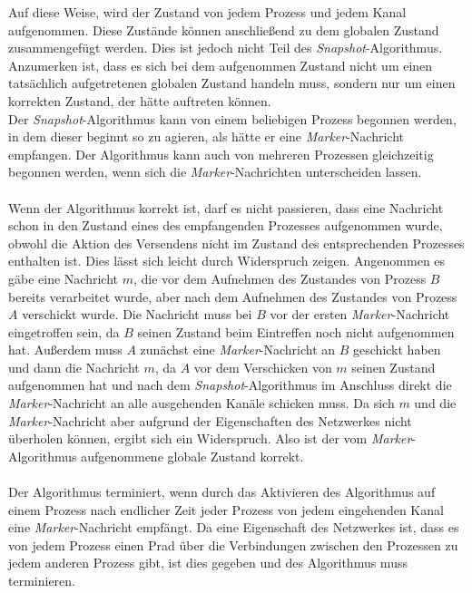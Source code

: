 \documentclass[ngerman]{fbi-aufgabenblatt}
\begin{document}
Auf diese Weise, wird der Zustand von jedem Prozess und jedem Kanal aufgenommen. Diese Zustände können anschließend zu dem globalen Zustand zusammengefügt werden. Dies ist jedoch nicht Teil des \textit{Snapshot}-Algorithmus. Anzumerken ist, dass es sich bei dem aufgenommen Zustand nicht um einen tatsächlich aufgetretenen globalen Zustand handeln muss, sondern nur um einen korrekten Zustand, der hätte auftreten können. \\
Der \textit{Snapshot}-Algorithmus kann von einem beliebigen Prozess begonnen werden, in dem dieser beginnt so zu agieren, als hätte er eine \textit{Marker}-Nachricht empfangen. Der Algorithmus kann auch von mehreren Prozessen gleichzeitig begonnen werden, wenn sich die \textit{Marker}-Nachrichten unterscheiden lassen. \\
\\
Wenn der Algorithmus korrekt ist, darf es nicht passieren, dass eine Nachricht schon in den Zustand eines des empfangenden Prozesses aufgenommen wurde, obwohl die Aktion des Versendens nicht im Zustand des entsprechenden Prozesses enthalten ist. Dies lässt sich leicht durch Widerspruch zeigen. Angenommen es gäbe eine Nachricht $m$, die vor dem Aufnehmen des Zustandes von Prozess $B$ bereits verarbeitet wurde, aber nach dem Aufnehmen des Zustandes von Prozess $A$ verschickt wurde. Die Nachricht muss bei $B$ vor der ersten \textit{Marker}-Nachricht eingetroffen sein, da $B$ seinen Zustand beim Eintreffen noch nicht aufgenommen hat. Außerdem muss $A$ zunächst eine \textit{Marker}-Nachricht an $B$ geschickt haben und dann die Nachricht $m$, da $A$ vor dem Verschicken von $m$ seinen Zustand aufgenommen hat und nach dem \textit{Snapshot}-Algorithmus im Anschluss direkt die \textit{Marker}-Nachricht an alle ausgehenden Kanäle schicken muss. Da sich $m$ und die \textit{Marker}-Nachricht aber aufgrund der Eigenschaften des Netzwerkes nicht überholen können, ergibt sich ein Widerspruch. Also ist der vom \textit{Marker}-Algorithmus aufgenommene globale Zustand korrekt. \\
\\
Der Algorithmus terminiert, wenn durch das Aktivieren des Algorithmus auf einem Prozess nach endlicher Zeit jeder Prozess von jedem eingehenden Kanal eine \textit{Marker}-Nachricht empfängt. Da eine Eigenschaft des Netzwerkes ist, dass es von jedem Prozess einen Prad über die Verbindungen zwischen den Prozessen zu jedem anderen Prozess gibt, ist dies gegeben und des Algorithmus muss terminieren.
\end{document}
